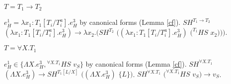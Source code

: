 \begin{case}
\begin{subcase}
\end{subcase}

\begin{subcase}

$T=T_{1}\rightarrow T_{2}$

$e_{H}^{1}=\lambda x_{1}:T_{1}[T_{i}/T_{i}^{a}].e_{H}^{3}$ by canonical forms (Lemma \ref{cf}).  $SH^{T_{1}\rightarrow T_{2}}$ $(\lambda x_{1}:T_{1}[T_{i}/T_{i}^{a}].e_{H}^{3})\rightarrow\lambda x_{2}.(SH^{T_{2}}$ $((\lambda x_{1}:T_{1}[T_{i}/T_{i}^{a}].e_{H}^{3})$ $(^{T_{1}}HS$ $x_{2})))$.

\end{subcase}

\begin{subcase}

$T=\forall X.T_{1}$

$e_{H}^{1}\in\lbrace\Lambda X.e_{H}^{3},{^{\forall X.T_{1}}H}S$ $v_{S}\rbrace$ by canonical forms (Lemma \ref{cf}).  $SH^{\forall X.T_{1}}$ $(\Lambda X.e_{H}^{3})\rightarrow SH^{T_{1}[L/X]}$ $((\Lambda X.e_{H}^{3})$ $\lbrace L\rbrace)$.  $SH^{\forall X.T_{1}}$ $(^{\forall X.T_{1}}HS$ $v_{S})\rightarrow v_{S}$.

\end{subcase}

\end{case}